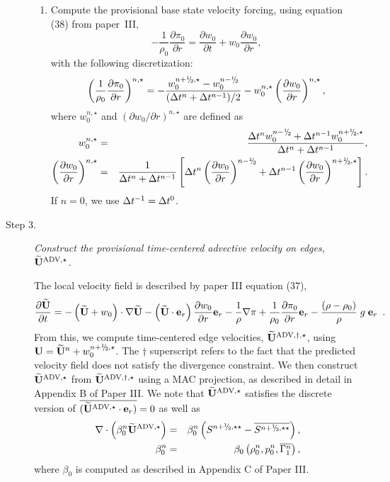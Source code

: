 \begin{description}
\begin{enumerate}
\item Compute the provisional base state velocity forcing, using equation (38)
  from paper~III,
\begin{equation}
-\frac{1}{\rho_0} \frac{\partial \pi_0}{\partial r} = \frac{\partial w_0}{\partial t} + w_0 \frac{\partial w_0}{\partial r}, \label{eq:pizero}
\end{equation}
  with the following discretization:
\begin{equation}
\left ( \frac{1}{\rho_0} \frac{\partial \pi_0}{\partial r} \right )^{n,\star} = -\frac{w_0^{\nph,\star} - w_0^\nmh}{(\dt^n+\dt^{n-1})/2} - w_0^{n,\star} \left(\frac{\partial w_0}{\partial r}\right)^{n,\star},
\end{equation} 
  where $w_0^{n,\star}$ and $(\partial w_0 / \partial r)^{n,\star}$ are defined as
\begin{eqnarray}
w_0^{n,\star} &=& \frac{\dt^{n} w_0^{\nmh} + \dt^{n-1} w_0^{\nph,\star}}{\dt^n+\dt^{n-1}}, \\
\left(\frac{\partial w_0}{\partial r}\right)^{n,\star} &=& \frac{1}{\dt^n+\dt^{n-1}}\left [ \dt^{n} \left(\frac{\partial w_0 }{ \partial r}\right)^{\nmh} + \dt^{n-1} \left(\frac{\partial w_0 }{ \partial r}\right)^{\nph,\star} \right ].\nonumber \\
\end{eqnarray}
  If $n=0$, we use $\Delta t^{-1} = \Delta t^0$.
\end{enumerate}

\item[Step 3.] {\em Construct the provisional time-centered advective velocity on 
edges, $\widetilde{\mathbf{U}}^{\mathrm{ADV},\star}$.}

The local velocity field is described by paper III equation (37),
\begin{equation}
\frac{\partial\widetilde{{\bf U}}}{\partial t} = 
- \left(\widetilde{{\bf U}}+w_0\right) \cdot \nabla \widetilde{{\bf U}}
- \left(\widetilde{{\bf U}} \cdot {\bf e}_r\right) \frac{\partial w_0}{\partial r} {\bf e}_r
- \frac{1}{\rho} \nabla\pi
+ \frac{1}{\rho_0} \frac{\partial \pi_0}{\partial r} {\bf e}_r
- \frac{(\rho-\rho_0)}{\rho} \; g \; {\bf e}_r  \label{eq:utildeupd}  \enskip .
\end{equation}
From this, we compute time-centered edge 
velocities, $\widetilde{{\bf U}}^{\mathrm{ADV},\dagger,\star}$, using 
$\Ub = \Ubt^n + w_0^{\nph,\star}$.  The $\dagger$ superscript refers to the 
fact that the predicted velocity field does not satisfy the divergence 
constraint.  We then construct $\widetilde{\mathbf{U}}^{\mathrm{ADV},\star}$ from $\widetilde{{\bf U}}^{\mathrm{ADV},\dagger,\star}$
using a MAC projection, as described in detail in Appendix B of Paper III.  
We note that $\widetilde{\mathbf{U}}^{\mathrm{ADV},\star}$ satisfies the discrete version of
$\overline{(\widetilde{\mathbf{U}}^{\mathrm{ADV},\star}\cdot{\bf e}_r)}=0$ as well as
\begin{eqnarray}
\nabla \cdot \left(\beta_0^n \uadvone\right) &=& \beta_0^n \left(S^{\nph,\star\star} - \overline{S^{\nph,\star\star}}\right),\\
 \beta_0^n &=& \beta_0 \left(\rho_0^n, p_0^n, \overline{\Gamma_1^n}\right),
\end{eqnarray}
where $\beta_0$ is computed as described in Appendix C of Paper III.


\end{description}
